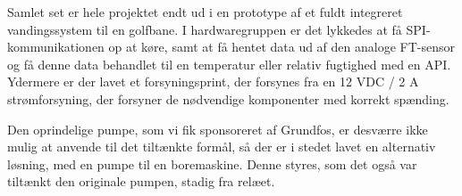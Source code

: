 
Samlet set er hele projektet endt ud i en prototype af et fuldt integreret vandingssystem til en golfbane. 
I hardwaregruppen er det lykkedes at få SPI-kommunikationen op at køre, samt at få hentet data ud af den analoge FT-sensor og få denne data behandlet til en temperatur eller relativ fugtighed med en API.
Ydermere er der lavet et forsyningsprint, der forsynes fra en 12 VDC / 2 A strømforsyning, der forsyner de nødvendige komponenter med korrekt spænding.

Den oprindelige pumpe, som vi fik sponsoreret af Grundfos, er desværre ikke mulig at anvende til det tiltænkte formål, så der er i stedet lavet en alternativ løsning, med en pumpe til en boremaskine. Denne styres, som det også var tiltænkt den originale pumpen, stadig fra relæet. 

